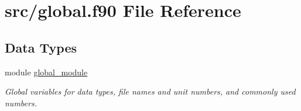 \hypertarget{global_8f90}{\section{src/global.f90 File Reference}
\label{global_8f90}
}
\subsection*{Data Types}
\begin{DoxyCompactItemize}
\item 
module \hyperlink{classglobal__module}{global\-\_\-module}
\begin{DoxyCompactList}\small\item\em Global variables for data types, file names and unit numbers, and commonly used numbers. \end{DoxyCompactList}\end{DoxyCompactItemize}
